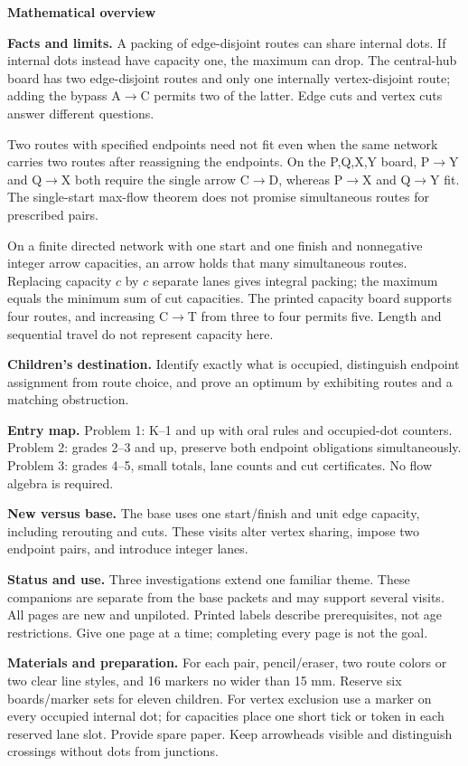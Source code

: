 \documentclass[11pt]{article}
\begin{document}
{\Large\bfseries Mathematical overview}\par\medskip
\textbf{Facts and limits.} A packing of edge-disjoint routes can share internal dots. If internal dots instead have capacity one, the maximum can drop. The central-hub board has two edge-disjoint routes and only one internally vertex-disjoint route; adding the bypass A\(\to\)C permits two of the latter. Edge cuts and vertex cuts answer different questions.

Two routes with specified endpoints need not fit even when the same network carries two routes after reassigning the endpoints. On the P,Q,X,Y board, P\(\to\)Y and Q\(\to\)X both require the single arrow C\(\to\)D, whereas P\(\to\)X and Q\(\to\)Y fit. The single-start max-flow theorem does not promise simultaneous routes for prescribed pairs.

On a finite directed network with one start and one finish and nonnegative integer arrow capacities, an arrow holds that many simultaneous routes. Replacing capacity \(c\) by \(c\) separate lanes gives integral packing; the maximum equals the minimum sum of cut capacities. The printed capacity board supports four routes, and increasing C\(\to\)T from three to four permits five. Length and sequential travel do not represent capacity here.

\textbf{Children's destination.} Identify exactly what is occupied, distinguish endpoint assignment from route choice, and prove an optimum by exhibiting routes and a matching obstruction.

\textbf{Entry map.} Problem 1: K--1 and up with oral rules and occupied-dot counters. Problem 2: grades 2--3 and up, preserve both endpoint obligations simultaneously. Problem 3: grades 4--5, small totals, lane counts and cut certificates. No flow algebra is required.

\textbf{New versus base.} The base uses one start/finish and unit edge capacity, including rerouting and cuts. These visits alter vertex sharing, impose two endpoint pairs, and introduce integer lanes.
\par\medskip
\textbf{Status and use.} Three investigations extend one familiar theme. These companions are separate from the base packets and may support several visits. All pages are new and unpiloted. Printed labels describe prerequisites, not age restrictions. Give one page at a time; completing every page is not the goal.

\textbf{Materials and preparation.} For each pair, pencil/eraser, two route colors or two clear line styles, and 16 markers no wider than 15 mm. Reserve six boards/marker sets for eleven children. For vertex exclusion use a marker on every occupied internal dot; for capacities place one short tick or token in each reserved lane slot. Provide spare paper. Keep arrowheads visible and distinguish crossings without dots from junctions.
\end{document}
